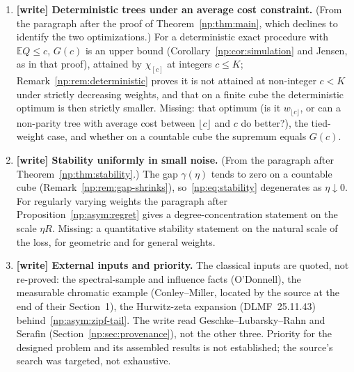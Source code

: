 \documentclass[11pt,a4paper]{article}
\theoremstyle{definition}
\theoremstyle{remark}
\newcommand{\E}{\mathbb E}
\begin{document}
\begin{enumerate}[label=\textbf{Q\arabic*.},ref=Q\arabic*,leftmargin=12mm,start=13]
\item\label{np:q:dettrees} \textbf{[write] Deterministic trees under an
 average cost constraint.} (From the paragraph after the proof of
 Theorem~\ref{np:thm:main}, which declines to identify the two
 optimizations.) For a deterministic exact procedure with
 $\E Q\le c$, $G(c)$ is an upper bound (Corollary~\ref{np:cor:simulation}
 and Jensen, as in that proof), attained by $\chi_{[c]}$ at integers
 $c\le K$; Remark~\ref{np:rem:deterministic} proves it is not attained at
 non-integer $c<K$ under strictly decreasing weights, and that on a finite
 cube the deterministic optimum is then strictly smaller. Missing: that
 optimum (is it $w_{\lfloor c\rfloor}$, or can a non-parity tree with
 average cost between $\lfloor c\rfloor$ and $c$ do better?), the tied-weight
 case, and whether on a countable cube the supremum equals $G(c)$.
\item\label{np:q:smallnoise} \textbf{[write] Stability uniformly in small
 noise.} (From the paragraph after Theorem~\ref{np:thm:stability}.) The
 gap $\gamma(\eta)$ tends to zero on a countable cube
 (Remark~\ref{np:rem:gap-shrinks}), so~\eqref{np:eq:stability} degenerates
 as $\eta\downarrow0$. For regularly varying weights the paragraph after
 Proposition~\ref{np:asym:regret} gives a degree-concentration statement
 on the scale $\eta R$. Missing: a quantitative stability statement on the
 natural scale of the loss, for geometric and for general weights.
\item\label{np:q:external} \textbf{[write] External inputs and priority.}
 The classical inputs are quoted, not re-proved: the spectral-sample and
 influence facts (O'Donnell), the measurable chromatic example
 (Conley--Miller, located by the source at the end of their Section~1),
 the Hurwitz-zeta expansion (DLMF~25.11.43) behind~\eqref{np:asym:zipf-tail}.
 The write read Geschke--Lubarsky--Rahn and Serafin
 (Section~\ref{np:sec:provenance}), not the other three. Priority for the
 designed problem and its assembled results is not established; the
 source's search was targeted, not exhaustive.
\end{enumerate}
\end{document}
